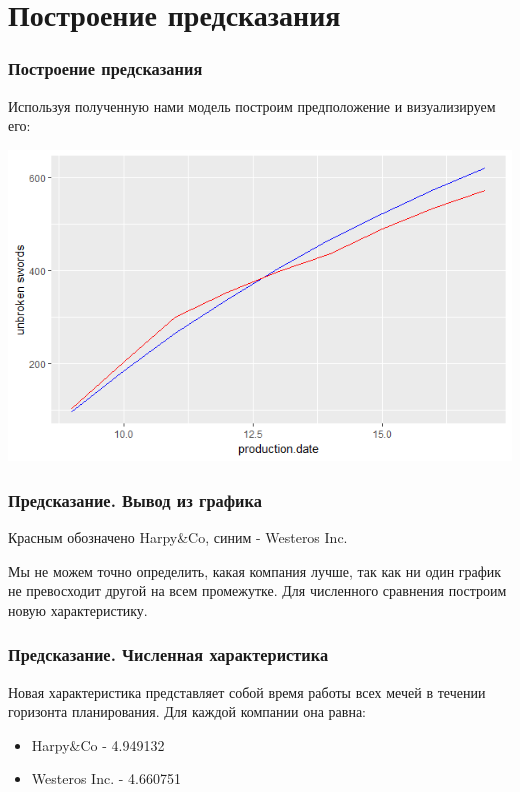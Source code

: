 \documentclass{beamer}
\begin{document}
\section{Построение предсказания}

\begin{frame}
    \frametitle{Построение предсказания}
    Используя полученную нами модель построим предположение и визуализируем его:
    
    \includegraphics[scale = 0.6]{swords.png}
    
\end{frame}

\begin{frame}
    \frametitle{Предсказание. Вывод из графика}
    
    Красным обозначено Harpy\&Co, синим - Westeros Inc. \
    
    Мы не можем точно определить, какая компания лучше, так как ни один график не превосходит другой на всем промежутке. Для численного сравнения построим новую характеристику.
\end{frame}

\begin{frame}
    \frametitle{Предсказание. Численная характеристика}
    
    Новая характеристика представляет собой время работы всех мечей в течении горизонта планирования. Для каждой компании она равна:
    
    \begin{itemize}
        \item Harpy\&Co - 4.949132
        \item Westeros Inc. - 4.660751
    \end{itemize}
\end{frame}
\end{document}
